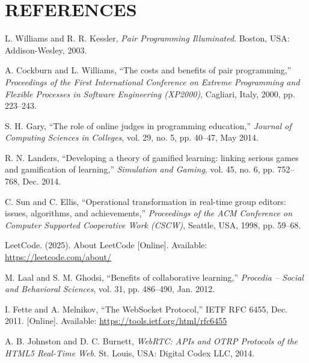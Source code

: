 \documentclass[12pt,a4paper,oneside]{report}
\begin{document}
\chapter*{REFERENCES}

\begin{enumerate}[label={[\arabic*]}, leftmargin=1.5cm, labelsep=0.5cm, itemsep=0.3cm]

\item L. Williams and R. R. Kessler, \textit{Pair Programming Illuminated}. Boston, USA: Addison-Wesley, 2003.

\item A. Cockburn and L. Williams, ``The costs and benefits of pair programming,'' \textit{Proceedings of the First International Conference on Extreme Programming and Flexible Processes in Software Engineering (XP2000)}, Cagliari, Italy, 2000, pp. 223--243.

\item S. H. Gary, ``The role of online judges in programming education,'' \textit{Journal of Computing Sciences in Colleges}, vol. 29, no. 5, pp. 40--47, May 2014.

\item R. N. Landers, ``Developing a theory of gamified learning: linking serious games and gamification of learning,'' \textit{Simulation and Gaming}, vol. 45, no. 6, pp. 752--768, Dec. 2014.

\item C. Sun and C. Ellis, ``Operational transformation in real-time group editors: issues, algorithms, and achievements,'' \textit{Proceedings of the ACM Conference on Computer Supported Cooperative Work (CSCW)}, Seattle, USA, 1998, pp. 59--68.

\item LeetCode. (2025). About LeetCode [Online]. Available: \url{https://leetcode.com/about/}

\item M. Laal and S. M. Ghodsi, ``Benefits of collaborative learning,'' \textit{Procedia -- Social and Behavioral Sciences}, vol. 31, pp. 486--490, Jan. 2012.

\item I. Fette and A. Melnikov, ``The WebSocket Protocol,'' IETF RFC 6455, Dec. 2011. [Online]. Available: \url{https://tools.ietf.org/html/rfc6455}

\item A. B. Johnston and D. C. Burnett, \textit{WebRTC: APIs and OTRP Protocols of the HTML5 Real-Time Web}. St. Louis, USA: Digital Codex LLC, 2014.


\end{enumerate}
\end{document}
